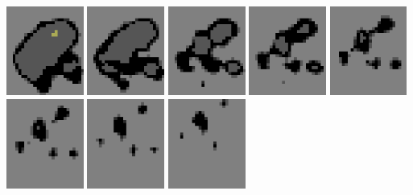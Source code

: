\documentclass[10pt]{book}
\begin{document}
\begin{CJK}{UTF8}{gkai}
\begin{center}
\includegraphics[width=0.19\textwidth]{previews/nightstrike_1-FIRE-07.png}
\includegraphics[width=0.19\textwidth]{previews/nightstrike_1-FIRE-08.png}
\includegraphics[width=0.19\textwidth]{previews/nightstrike_1-FIRE-09.png}
\includegraphics[width=0.19\textwidth]{previews/nightstrike_1-FIRE-10.png}
\includegraphics[width=0.19\textwidth]{previews/nightstrike_1-FIRE-11.png}
\includegraphics[width=0.19\textwidth]{previews/nightstrike_1-FIRE-12.png}
\includegraphics[width=0.19\textwidth]{previews/nightstrike_1-FIRE-13.png}
\includegraphics[width=0.19\textwidth]{previews/nightstrike_1-FIRE-14.png}
\end{center}
\clearpage


\end{CJK}
\end{document}
